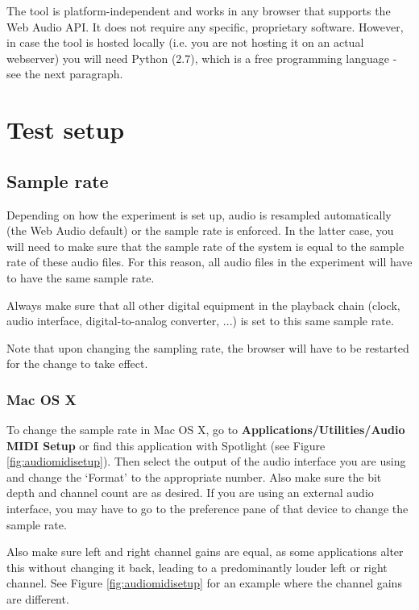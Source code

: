 \documentclass[11pt, oneside]{article}   	%
\begin{document}
		The tool is platform-independent and works in any browser that supports the Web Audio API. It does not require any specific, proprietary software. However, in case the tool is hosted locally (i.e. you are not hosting it on an actual webserver) you will need Python (2.7), which is a free programming language - see the next paragraph. 
	
\clearpage


\section{Test setup}

	\subsection{Sample rate}
		Depending on how the experiment is set up, audio is resampled automatically (the Web Audio default) or the sample rate is enforced. In the latter case, you will need to make sure that the sample rate of the system is equal to the sample rate of these audio files. For this reason, all audio files in the experiment will have to have the same sample rate. 

		Always make sure that all other digital equipment in the playback chain (clock, audio interface, digital-to-analog converter, ...) is set to this same sample rate.

		Note that upon changing the sampling rate, the browser will have to be restarted for the change to take effect. 
		
		\subsubsection{Mac OS X}
			To change the sample rate in Mac OS X, go to \textbf{Applications/Utilities/Audio MIDI Setup} or find this application with Spotlight (see Figure \ref{fig:audiomidisetup}). Then select the output of the audio interface you are using and change the `Format' to the appropriate number. Also make sure the bit depth and channel count are as desired. 
			If you are using an external audio interface, you may have to go to the preference pane of that device to change the sample rate. 

			Also make sure left and right channel gains are equal, as some applications alter this without changing it back, leading to a predominantly louder left or right channel. See Figure \ref{fig:audiomidisetup} for an example where the channel gains are different. 
\end{document}
